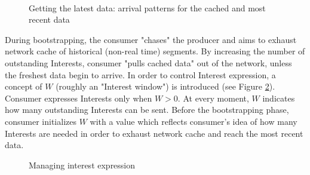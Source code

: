 \documentclass{icn/sig-alternate-2012} %
\begin{document}
\begin{figure}[t!]
\centering

\\

\caption{Getting the latest data: arrival patterns for the cached and most recent data}
\label{fig:inter-arrival}
\end{figure}

During bootstrapping, the consumer "chases" the producer and aims to exhaust network cache of historical (non-real time) segments. By increasing the number of outstanding Interests, consumer "pulls cached data" out of the network, unless the freshest data begin to arrive. In order to control Interest expression, a concept of $W$ (roughly an "Interest window") is introduced (see Figure \ref{fig:w-concept}). Consumer expresses Interests only when $W > 0$. At every moment, $W$ indicates how many outstanding Interests can be sent. Before the bootstrapping phase, consumer initializes $W$ with a value which reflects consumer's idea of how many Interests are needed in order to exhaust network cache and reach the most recent data. 

\begin{figure}[t!]
\centering


\caption{Managing interest expression}
\label{fig:w-concept}
\end{figure}
\end{document}
